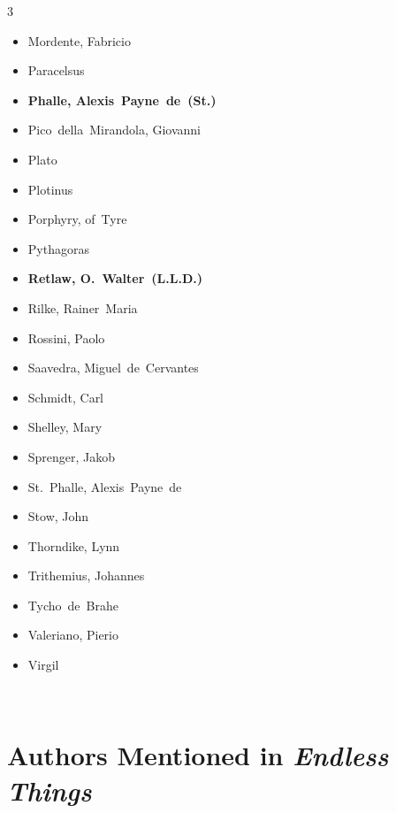 \documentclass[10pt,makeidx]{extreport}
\newcommand\fleuron{\begin{turn}{45}\Large \ding{166}\end{turn}}
\newcommand\doublefleuron{%
	\reflectbox{\fleuron}\AC\staveXLIX\reflectbox{\AC}\fleuron}
\newcommand\fleuronbar{%
	{\huge\LinearACCCXIII}\xrfill[1.3ex]{1pt}\doublefleuron\xrfill[1.3ex]{1pt}\reflectbox{\huge\LinearACCCXIII}}
\newcommand\nbvspace[1][3]{\vspace*{\stretch{#1}}}
\begin{document}
\begin{multicols}{3}
\begin{itemize}
  \item Mordente, Fabricio
  \item Paracelsus
  \item \textbf{Phalle, Alexis~Payne~de~(St.)}
  \item Pico~della~Mirandola, Giovanni
  \item Plato
  \item Plotinus
  \item Porphyry, of~Tyre
  \item Pythagoras
  \item \textbf{Retlaw, O.~Walter~(L.L.D.)}
  \item Rilke, Rainer~Maria
  \item Rossini, Paolo
  \item Saavedra, Miguel~de~Cervantes
  \item Schmidt, Carl
  \item Shelley, Mary
  \item Sprenger, Jakob
  \item St.~Phalle, Alexis~Payne~de
  \item Stow, John
  \item Thorndike, Lynn
  \item Trithemius, Johannes
  \item Tycho~de~Brahe
  \item Valeriano, Pierio
  \item Virgil
\end{itemize}
\end{multicols}

\bigskip
\begin{center}
\vfill
\shadowoffset{1pt}
\shadowtext{%
{\color{Mahogany}\fontsize{60}{64}\Earth}}\\
\nbvspace[1]
\end{center}


\section{Authors Mentioned in \textit{Endless Things}}
\end{document}

